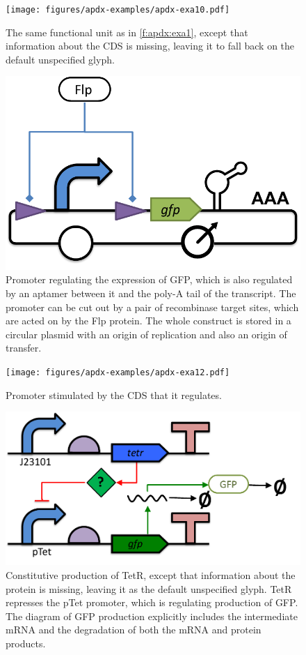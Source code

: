 \begin{figure}[h!]
\texttt{[image: figures/apdx-examples/apdx-exa10.pdf]}
\caption{The same functional unit as in \ref{f:apdx:exa1}, except that information about the CDS is missing, leaving it to fall back on the default unspecified glyph.}
\label{f:apdx:exa10}
\end{figure}

\begin{figure}[h!]
\includegraphics[scale=0.5]{figures/apdx-examples/apdx-exa11.pdf}
\caption{Promoter regulating the expression of GFP, which is also regulated by an aptamer between it and the poly-A tail of the transcript. The promoter can be cut out by a pair of recombinase target sites, which are acted on by the Flp protein.  The whole construct is stored in a circular plasmid with an origin of replication and also an origin of transfer.}
\label{f:apdx:exa11}
\end{figure}

\begin{figure}[h!]
\texttt{[image: figures/apdx-examples/apdx-exa12.pdf]}
\caption{Promoter stimulated by the CDS that it regulates.}
\label{f:apdx:exa12}
\end{figure}

\begin{figure}[h!]
\includegraphics[scale=0.5]{figures/apdx-examples/apdx-exa13.pdf}
\caption{Constitutive production of TetR, except that information about the protein is missing, leaving it as the default unspecified glyph. TetR represses the pTet promoter, which is regulating production of GFP.  The diagram of GFP production explicitly includes the intermediate mRNA and the degradation of both the mRNA and protein products.}
\label{f:apdx:exa13}
\end{figure}

